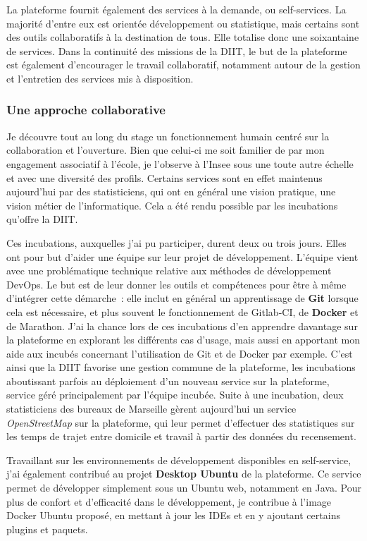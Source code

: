La plateforme fournit également des services à la demande, ou self-services. La majorité d'entre eux est orientée développement ou statistique, mais certains sont des outils collaboratifs à la destination de tous. Elle totalise donc une soixantaine de services. Dans la continuité des missions de la DIIT, le but de la plateforme est également d'encourager le travail collaboratif, notamment autour de la gestion et l'entretien des services mis à disposition.

\subsubsection{Une approche collaborative}
Je découvre tout au long du stage un fonctionnement humain centré sur la collaboration et l'ouverture. Bien que celui-ci me soit familier de par mon engagement associatif à l'école, je l'observe à l'Insee sous une toute autre échelle et avec une diversité des profils. Certains services sont en effet maintenus aujourd'hui par des statisticiens, qui ont en général une vision pratique, une vision métier de l'informatique. Cela a été rendu possible par les incubations qu'offre la DIIT.
\newline

Ces incubations, auxquelles j'ai pu participer, durent deux ou trois jours. Elles ont pour but d'aider une équipe sur leur projet de développement. L'équipe vient avec une problématique technique relative aux méthodes de développement DevOps. Le but est de leur donner les outils et compétences pour être à même d'intégrer cette démarche~: elle inclut en général un apprentissage de \textbf{Git} lorsque cela est nécessaire, et plus souvent le fonctionnement de Gitlab-CI, de \textbf{Docker} et de Marathon. J'ai la chance lors de ces incubations d'en apprendre davantage sur la plateforme en explorant les différents cas d'usage, mais aussi en apportant mon aide aux incubés concernant l'utilisation de Git et de Docker par exemple. C'est ainsi que la DIIT favorise une gestion commune de la plateforme, les incubations aboutissant parfois au déploiement d'un nouveau service sur la plateforme, service géré principalement par l'équipe incubée. Suite à une incubation, deux statisticiens des bureaux de Marseille gèrent aujourd'hui un service \textit{OpenStreetMap} sur la plateforme, qui leur permet d'effectuer des statistiques sur les temps de trajet entre domicile et travail à partir des données du recensement.
\newline

Travaillant sur les environnements de développement disponibles en self-service, j'ai également contribué au projet \textbf{Desktop Ubuntu} de la plateforme. Ce service permet de développer simplement sous un Ubuntu web, notamment en Java. Pour plus de confort et d'efficacité dans le développement, je contribue à l'image Docker Ubuntu proposé, en mettant à jour les IDEs et en y ajoutant certains plugins et paquets.
\label{section 2.2.2}

